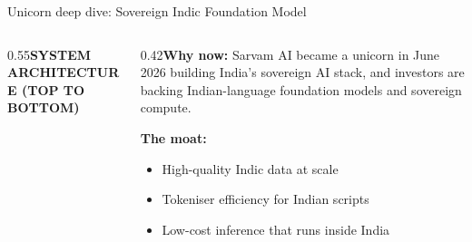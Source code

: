 \documentclass[aspectratio=169,10pt]{beamer}
\begin{document}
\begin{frame}{Unicorn deep dive: Sovereign Indic Foundation Model}
\begin{columns}[T]
\begin{column}{0.55\textwidth}{\scriptsize\bfseries\color{gold}SYSTEM ARCHITECTURE (TOP TO BOTTOM)}
\end{column}\begin{column}{0.42\textwidth}\scriptsize\textbf{Why now:} Sarvam AI became a unicorn in June 2026 building India's sovereign AI stack, and investors are backing Indian-language foundation models and sovereign compute.\par\vspace{4pt}\textbf{The moat:}\begin{itemize}\setlength\itemsep{0pt}
\item High-quality Indic data at scale
\item Tokeniser efficiency for Indian scripts
\item Low-cost inference that runs inside India
\end{itemize}\vspace{3pt}\end{column}\end{columns}\end{frame}
\end{document}
